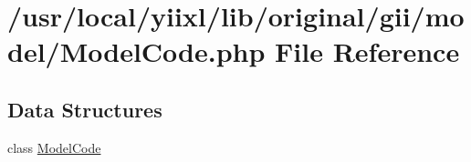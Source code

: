 \hypertarget{ModelCode_8php}{
\section{/usr/local/yiixl/lib/original/gii/model/ModelCode.php File Reference}
\label{ModelCode_8php}
}
\subsection*{Data Structures}
\begin{DoxyCompactItemize}
\item 
class \hyperlink{classModelCode}{ModelCode}
\end{DoxyCompactItemize}
